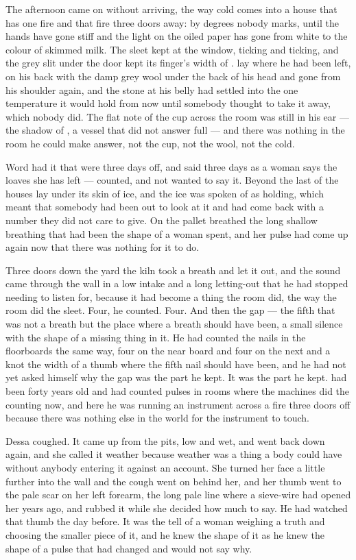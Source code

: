 The afternoon came on without arriving, the way cold comes into a house that has one fire and that fire three doors away: by degrees nobody marks, until the hands have gone stiff and the light on the oiled paper has gone from white to the colour of skimmed milk. The sleet kept at the window, ticking and ticking, and the grey slit under the door kept its finger's width of .  lay where he had been left, on his back with the damp grey wool under the back of his head and gone from his shoulder again, and the stone at his belly had settled into the one temperature it would hold from now until somebody thought to take it away, which nobody did. The flat note of the cup across the room was still in his ear --- the shadow of , a vessel that did not answer full --- and there was nothing in the room he could make answer, not the cup, not the wool, not the cold.

Word had it that  were three days off, and  said three days as a woman says the loaves she has left --- counted, and not wanted to say it. Beyond the last of the houses  lay under its skin of ice, and the ice was spoken of as holding, which meant that somebody had been out to look at it and had come back with a number they did not care to give. On the pallet  breathed the long shallow breathing that had been the shape of a woman spent, and her pulse had come up again now that there was nothing for it to do.

Three doors down the yard the kiln took a breath and let it out, and the sound came through the wall in a low intake and a long letting-out that he had stopped needing to listen for, because it had become a thing the room did, the way the room did the sleet. Four, he counted. Four. And then the gap --- the fifth that was not a breath but the place where a breath should have been, a small silence with the shape of a missing thing in it. He had counted the nails in the floorboards the same way, four on the near board and four on the next and a knot the width of a thumb where the fifth nail should have been, and he had not yet asked himself why the gap was the part he kept. It was the part he kept.  had been forty years old and had counted pulses in rooms where the machines did the counting now, and here he was running an instrument across a fire three doors off because there was nothing else in the world for the instrument to touch.

Dessa coughed. It came up from the pits, low and wet, and went back down again, and she called it weather because weather was a thing a body could have without anybody entering it against an account. She turned her face a little further into the wall and the cough went on behind her, and her thumb went to the pale scar on her left forearm, the long pale line where a sieve-wire had opened her years ago, and rubbed it while she decided how much to say. He had watched that thumb the day before. It was the tell of a woman weighing a truth and choosing the smaller piece of it, and he knew the shape of it as he knew the shape of a pulse that had changed and would not say why.

